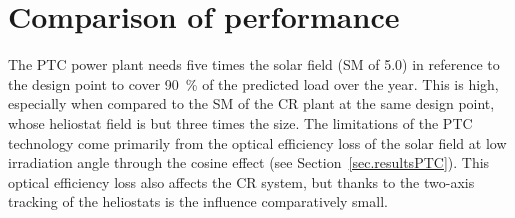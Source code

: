 \section{Comparison of performance}

%
%

The \ac{PTC} power plant needs five times the solar field (\ac{SM} of \num{5.0}) in reference to the design point to cover \SI{90}{\percent} of the predicted load over the year. This is high, especially when compared to the \ac{SM} of the \ac{CR} plant at the same design point, whose heliostat field is but three times the size. The limitations of the \ac{PTC} technology come primarily from the optical efficiency loss of the solar field at low irradiation angle through the cosine effect (see Section~\ref{sec.resultsPTC}). This optical efficiency loss also affects the \ac{CR} system, but thanks to the two-axis tracking of the heliostats is the influence comparatively small. 

